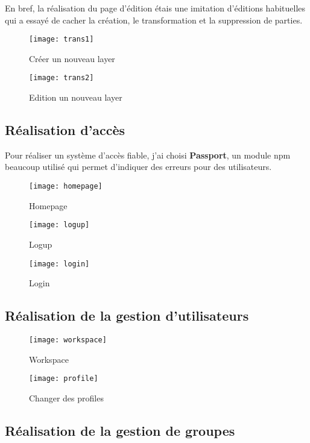 En bref, la réalisation du page d'édition étais une imitation d'éditions habituelles qui a essayé de cacher la création, le transformation et la suppression de parties. 

\begin{figure}[H]
\centering
\texttt{[image: trans1]}
\caption{Créer un nouveau layer}
\end{figure}

\begin{figure}[H]
\centering
\texttt{[image: trans2]}
\caption{Edition un nouveau layer}
\end{figure}

\subsection{Réalisation d'accès}

Pour réaliser un système d'accès fiable, j'ai choisi \textbf{Passport}, un module npm beaucoup utilisé qui permet d'indiquer des erreurs pour des utilisateurs.

\begin{figure}[H]
\centering
\texttt{[image: homepage]}
\caption{Homepage}
\end{figure}

\begin{figure}[H]
\centering
\texttt{[image: logup]}
\caption{Logup}
\end{figure}

\begin{figure}[H]
\centering
\texttt{[image: login]}
\caption{Login}
\end{figure}

\subsection{Réalisation de la gestion d'utilisateurs}

\begin{figure}[H]
\centering
\texttt{[image: workspace]}
\caption{Workspace}
\end{figure}

\begin{figure}[H]
\centering
\texttt{[image: profile]}
\caption{Changer des profiles}
\end{figure}

\subsection{Réalisation de la gestion de groupes}

